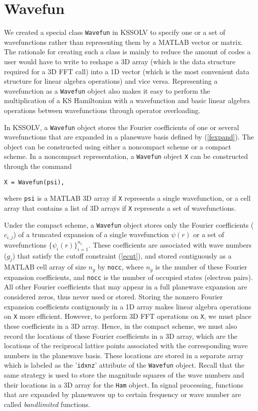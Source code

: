 \documentclass[11pt]{book}
\begin{document}
\section{Wavefun}
We created a special class {\tt Wavefun} in KSSOLV to specify one
or a set of wavefunctions rather than representing them by a MATLAB vector
or matrix.  The rationale for creating such a class is mainly
to reduce the amount of codes a user would have to write to 
reshape a 3D array (which is the data structure required for a 3D FFT call)
into a 1D vector (which is the most convenient data structure
for linear algebra operations) and vice versa.  Representing 
a wavefunction as a {\tt Wavefun} object also makes it easy to 
perform the multiplication of a KS Hamiltonian with a wavefunction
and basic linear algebra operations between  wavefunctions
through operator overloading.  

In KSSOLV, a {\tt Wavefun} object stores the Fourier coefficients
of one or several wavefunctions that are expanded in a planewave 
basis defined by (\ref{fexpand}).  The object can be constructed 
using either a noncompact scheme or a compact scheme.  In a noncompact 
representation, a {\tt Wavefun} object {\tt X} can be constructed 
through the command
\begin{verbatim}
X = Wavefun(psi),
\end{verbatim}
where {\tt psi} is a MATLAB 3D array if {\tt X} represents a single
wavefunction, or a cell array that contains a list of 3D arrays if
{\tt X} represents a set of wavefunctions.

Under the compact scheme, a {\tt Wavefun} object stores 
only the Fourier coefficients ($c_{i,j}$) of a truncated expansion of
a single wavefunction $\psi(r)$ or a set of wavefunctions 
$\{\psi_i(r)\}_{i=1}^{n_e}$.  These coefficients are associated with wave 
numbers ($g_j$) that satisfy the cutoff constraint (\ref{ecut}), and stored 
contiguously as a MATLAB cell array of size $n_g$ by {\tt nocc}, 
where $n_g$ is the number of these Fourier expansion coefficients, 
and {\tt nocc} is the number of occupied states (electron pairs).  
All other Fourier coefficients that may appear in a full planewave 
expansion are considered zeros, thus never used or stored.  
Storing the nonzero Fourier expansion coefficients contiguously in 
a 1D array makes linear algebra operations on {\tt X} more efficient. 
However, to perform 3D FFT operations on {\tt X}, we must place these 
coefficients in a 3D array. Hence, in the compact scheme, we must also 
record the locations of these Fourier coefficients in a 3D array, 
which are the locations of the reciprocal lattice points associated with 
the corresponding wave numbers in the planewave basis.  These locations 
are stored in a separate array which is labeled as the '{\tt idxnz}' 
attribute of the {\tt Wavefun} object.  Recall that the same strategy 
is used to store the magnitude squares of the wave numbers and their 
locations in a 3D array for the {\tt Ham} object.  In signal processing, 
functions that are expanded by planewaves up to certain frequency or wave 
number are called {\em bandlimited} functions.  
\end{document}
